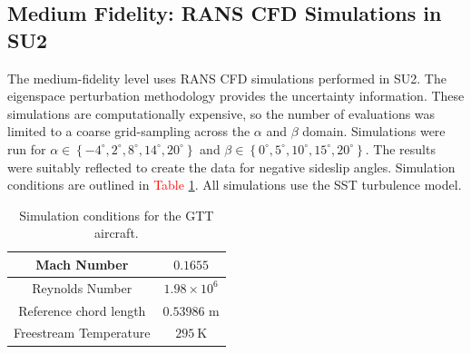 \subsection{Medium Fidelity: RANS CFD Simulations in SU2} \label{subsec:gtt_cfd_data_gen}

The medium-fidelity level uses RANS CFD simulations performed in SU2.
The eigenspace perturbation methodology provides the uncertainty information.
These simulations are computationally expensive, so the number of evaluations was limited to a coarse grid-sampling across the $\alpha$ and $\beta$ domain.
Simulations were run for $\alpha \in \left \{ -4^\circ,2^\circ,8^\circ,14^\circ,20^\circ \right \}$ and $\beta \in \left \{ 0^\circ,5^\circ,10^\circ,15^\circ,20^\circ \right \}$.
The results were suitably reflected to create the data for negative sideslip angles. 
Simulation conditions are outlined in \textcolor{red}{Table \ref{tab:gtt_test_cond}}. 
All simulations use the SST turbulence model.

\begin{table}
\centering
    \renewcommand{\arraystretch}{1.2}
    \captionsetup{justification=centering}
    \caption{Simulation conditions for the GTT aircraft.} 
    \begin{tabular}{|c|c|}
        \hline
        Mach Number & $0.1655$ \\ \hline
        Reynolds Number & $1.98\times10^6$ \\ \hline
        Reference chord length & $0.53986$ m \\ \hline
        Freestream Temperature & $295~\text{K}$ \\ \hline
    \end{tabular}
    \label{tab:gtt_test_cond}
\end{table}

